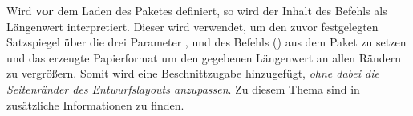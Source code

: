 \begin{Bundle*}{}
\begin{Declaration}{}
\printdeclarationlist%
%
Wird  \textbf{vor} dem Laden des Paketes 
definiert, so wird der Inhalt des Befehls als Längenwert interpretiert. Dieser 
wird verwendet, um den zuvor festgelegten Satzspiegel über die drei Parameter
,
 und 
 des
Befehls () aus dem Paket  
zu setzen und das erzeugte Papierformat um den gegebenen Längenwert an allen 
Rändern zu vergrößern. Somit wird eine Beschnittzugabe hinzugefügt, \emph{ohne 
dabei die Seitenränder des Entwurfslayouts anzupassen}. Zu diesem Thema sind in 
 zusätzliche Informationen zu finden.
\end{Declaration}
%
\end{Bundle*}
